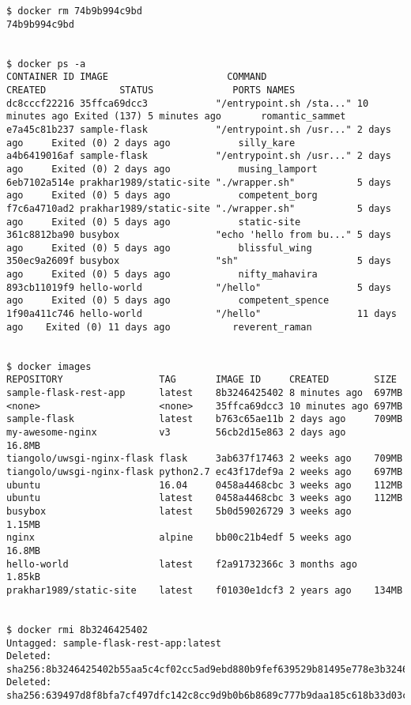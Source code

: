 \begin{lstlisting}[basicstyle=\tiny]
$ docker rm 74b9b994c9bd
74b9b994c9bd


$ docker ps -a
CONTAINER ID IMAGE                     COMMAND                  CREATED             STATUS              PORTS NAMES
dc8cccf22216 35ffca69dcc3            "/entrypoint.sh /sta..." 10 minutes ago Exited (137) 5 minutes ago       romantic_sammet
e7a45c81b237 sample-flask            "/entrypoint.sh /usr..." 2 days ago     Exited (0) 2 days ago            silly_kare
a4b6419016af sample-flask            "/entrypoint.sh /usr..." 2 days ago     Exited (0) 2 days ago            musing_lamport
6eb7102a514e prakhar1989/static-site "./wrapper.sh"           5 days ago     Exited (0) 5 days ago            competent_borg
f7c6a4710ad2 prakhar1989/static-site "./wrapper.sh"           5 days ago     Exited (0) 5 days ago            static-site
361c8812ba90 busybox                 "echo 'hello from bu..." 5 days ago     Exited (0) 5 days ago            blissful_wing
350ec9a2609f busybox                 "sh"                     5 days ago     Exited (0) 5 days ago            nifty_mahavira
893cb11019f9 hello-world             "/hello"                 5 days ago     Exited (0) 5 days ago            competent_spence
1f90a411c746 hello-world             "/hello"                 11 days ago    Exited (0) 11 days ago           reverent_raman


$ docker images
REPOSITORY                 TAG       IMAGE ID     CREATED        SIZE
sample-flask-rest-app      latest    8b3246425402 8 minutes ago  697MB
<none>                     <none>    35ffca69dcc3 10 minutes ago 697MB
sample-flask               latest    b763c65ae11b 2 days ago     709MB
my-awesome-nginx           v3        56cb2d15e863 2 days ago     16.8MB
tiangolo/uwsgi-nginx-flask flask     3ab637f17463 2 weeks ago    709MB
tiangolo/uwsgi-nginx-flask python2.7 ec43f17def9a 2 weeks ago    697MB
ubuntu                     16.04     0458a4468cbc 3 weeks ago    112MB
ubuntu                     latest    0458a4468cbc 3 weeks ago    112MB
busybox                    latest    5b0d59026729 3 weeks ago    1.15MB
nginx                      alpine    bb00c21b4edf 5 weeks ago    16.8MB
hello-world                latest    f2a91732366c 3 months ago   1.85kB
prakhar1989/static-site    latest    f01030e1dcf3 2 years ago    134MB


$ docker rmi 8b3246425402
Untagged: sample-flask-rest-app:latest
Deleted: sha256:8b3246425402b55aa5c4cf02cc5ad9ebd880b9fef639529b81495e778e3b3246
Deleted: sha256:639497d8f8bfa7cf497dfc142c8cc9d9b0b6b8689c777b9daa185c618b33d03c
\end{lstlisting}

